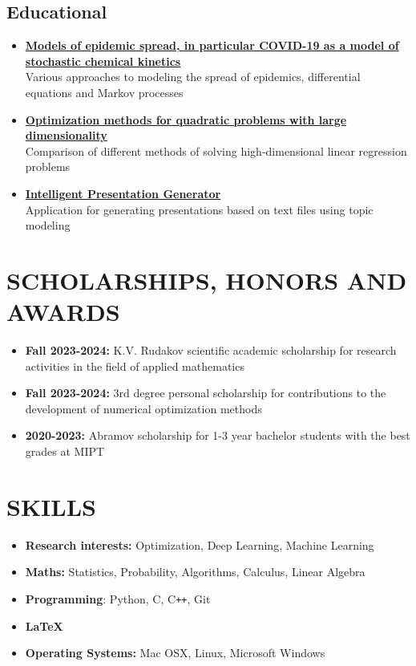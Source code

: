 \documentclass[12pt]{moderncv}
\begin{document}
        \subsection{Educational}

        \begin{itemize}
            \item \href{https://github.com/kisnikser/Epidemic-Spread-Models}{\textbf{Models of epidemic spread, in particular COVID-19 as a model of stochastic chemical kinetics}}\\
            Various approaches to modeling the spread of epidemics, differential equations and Markov processes
            \item \href{https://github.com/kisnikser/Optimization-Methods}{\textbf{Optimization methods for quadratic problems with large dimensionality}}\\
            Comparison of different methods of solving high-dimensional linear regression problems
            \item \href{https://github.com/kisnikser/Intelligent-Presentation-Generator}{\textbf{Intelligent Presentation Generator}}\\
            Application for generating presentations based on text files using topic modeling
        \end{itemize}

    \section{SCHOLARSHIPS, HONORS AND AWARDS}

        \begin{itemize}
            \item \textbf{Fall 2023-2024:} K.V. Rudakov scientific academic scholarship for research activities in the field of applied mathematics
            \item \textbf{Fall 2023-2024:} 3rd degree personal scholarship for contributions to the development of numerical optimization methods
            \item \textbf{2020-2023:} Abramov scholarship for 1-3 year bachelor students with the best grades at MIPT
        \end{itemize}

    \section{SKILLS}
    
        \begin{itemize}
            \item \textbf{Research interests:} Optimization, Deep Learning, Machine Learning
            \item \textbf{Maths:} Statistics, Probability, Algorithms, Calculus, Linear Algebra
            \item \textbf{Programming}: Python, C, C\texttt{++}, Git
            \item \textbf{\LaTeX}
            \item \textbf{Operating Systems:} Mac OSX, Linux, Microsoft Windows
        \end{itemize}
\end{document}
